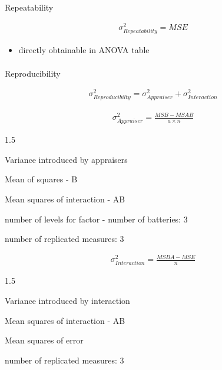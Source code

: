 \documentclass[
  a4paper,
]{scrbook}
\makeatletter
\let\oldparagraph\paragraph
\renewcommand{\paragraph}{
    \@ifstar
      \xxxParagraphStar
      \xxxParagraphNoStar
  }
\newcommand{\xxxParagraphStar}[1]{\oldparagraph*{#1}\mbox{}}
\newcommand{\xxxParagraphNoStar}[1]{\oldparagraph{#1}\mbox{}}
\providecommand{\tightlist}{%
  \setlength{\itemsep}{0pt}\setlength{\parskip}{0pt}}\usepackage{longtable,booktabs,array}
\let\olddescription\description
\let\endolddescription\enddescription
\renewenvironment{description}{
          \begin{spacing}{1.5}\olddescription
        }{
          \endolddescription\end{spacing}
        }
\makeatother
\begin{document}
\paragraph{Repeatability}\label{repeatability}

\begin{align}
\sigma^2_{Repeatability} = MSE
\end{align}

\begin{itemize}
\tightlist
\item
  directly obtainable in ANOVA table
\end{itemize}

\paragraph{Reproducibility}\label{reproducibility}

\begin{align}
\sigma^2_{Reproducibilty} = \sigma^2_{Appraiser} + \sigma^2_{Interaction}
\end{align}

\begin{align}
\sigma^2_{Appraiser} = \frac{MSB-MSAB}{a \times n}
\end{align}

\begin{description}
\tightlist
\item[\(\sigma^2_{Appraiser}\)]
Variance introduced by appraisers
\item[\(MSB\)]
Mean of squares - B
\item[\(MSAB\)]
Mean squares of interaction - AB
\item[\(a\)]
number of levels for factor - number of batteries: 3
\item[\(n\)]
number of replicated measures: 3
\end{description}

\begin{align}
\sigma^2_{Interaction} = \frac{MSBA-MSE}{n}
\end{align}

\begin{description}
\tightlist
\item[\(\sigma^2_{Interaction}\)]
Variance introduced by interaction
\item[\(MSAB\)]
Mean squares of interaction - AB
\item[\(MSE\)]
Mean squares of error
\item[\(n\)]
number of replicated measures: 3
\end{description}
\end{document}
